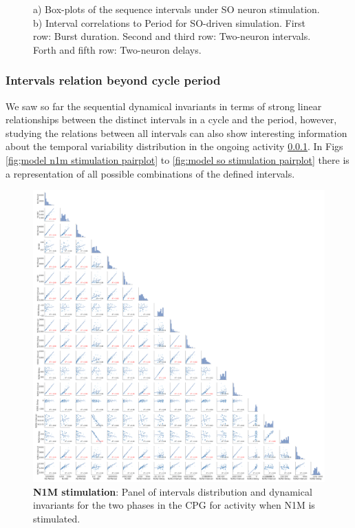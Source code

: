 \begin{figure}[hbt!]
\begin{minipage}[b]{0.53\textwidth}
\begin{minipage}[b]{\textwidth}
		\end{minipage}
	\end{minipage}
	\caption{a) Box-plots of the sequence intervals under SO neuron stimulation. b) Interval correlations to Period for SO-driven simulation. First row: Burst duration. Second and third row: Two-neuron intervals. Forth and fifth row: Two-neuron delays.}
	\label{fig:invariant n3t test17}
\end{figure}



\subsubsection{Intervals relation beyond cycle period}
We saw so far the sequential dynamical invariants in terms of strong linear relationships between the distinct intervals in a cycle and the period, however, studying the relations between all intervals can also show interesting information about the temporal variability distribution in the ongoing activity \ref{}. In Figs \ref{fig;model n1m stimulation pairplot} to \ref{fig:model so stimulation pairplot} there is a representation of all possible combinations of the defined intervals. 



\begin{figure}[htbp]
	\centering
	\includegraphics[width=\textwidth]{./invariants/data/MODEL/n1m_driven/images/3phases/_output_pairplot.png}
	\caption{\textbf{N1M stimulation}: Panel of intervals distribution and dynamical invariants for the two phases in the CPG for activity when N1M is stimulated.}
	\label{fig:model n1m stimulation pairplot}
\end{figure}
 

